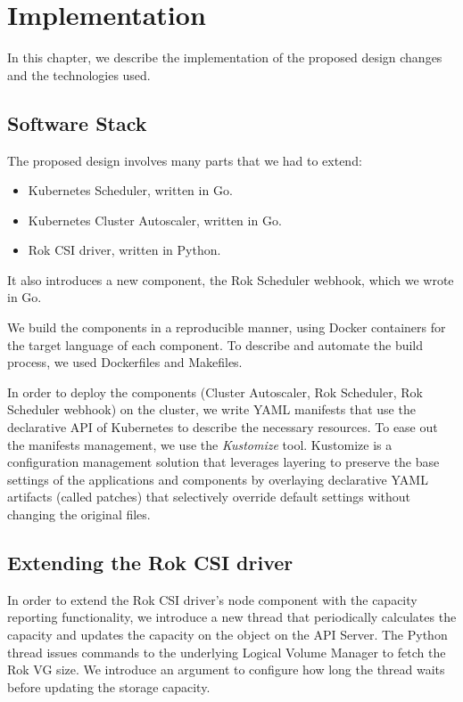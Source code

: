 \chapter{Implementation} \label{chapter:implementation}
In this chapter, we describe the implementation of the proposed design changes and the technologies used.

\section{Software Stack}

The proposed design involves many parts that we had to extend:
\begin{itemize}
      \tightlist
      \item Kubernetes Scheduler, written in Go.
      \item Kubernetes Cluster Autoscaler, written in Go.
      \item Rok CSI driver, written in Python.
\end{itemize}

It also introduces a new component, the Rok Scheduler webhook, which we wrote in
Go.

We build the components in a reproducible manner, using Docker containers for
the target language of each component. To describe and automate the build
process, we used Dockerfiles and Makefiles.

In order to deploy the components (Cluster Autoscaler, Rok Scheduler, Rok
Scheduler webhook) on the cluster, we write YAML manifests that use the
declarative API of Kubernetes to describe the necessary resources. To ease out
the manifests management, we use the \textit{Kustomize} tool. Kustomize is a
configuration management solution that leverages layering to preserve the base
settings of the applications and components by overlaying declarative YAML
artifacts (called patches) that selectively override default settings without
changing the original files.


\section{Extending the Rok CSI driver}

In order to extend the Rok CSI driver's node component with the capacity
reporting functionality, we introduce a new thread that periodically calculates
the capacity and updates the capacity on the  object on the API Server. The
Python thread issues commands to the underlying Logical Volume Manager to fetch
the Rok VG size. We introduce an argument {} to
configure how long the thread waits before updating the storage capacity.


